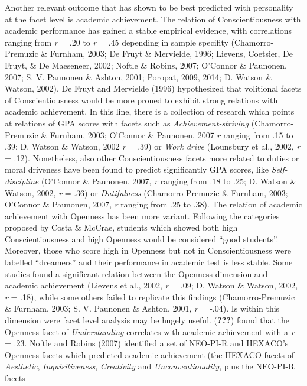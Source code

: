 \documentclass[,man,floatsintext]{apa6}
\begin{document}
Another relevant outcome that has shown to be best predicted with
personality at the facet level is academic achievement. The relation of
Conscientiousness with academic performance has gained a stable
empirical evidence, with correlations ranging from \emph{r} = .20 to
\emph{r} = .45 depending in sample specifity (Chamorro-Premuzic \&
Furnham, 2003; De Fruyt \& Mervielde, 1996; Lievens, Coetsier, De Fruyt,
\& De Maeseneer, 2002; Noftle \& Robins, 2007; O'Connor \& Paunonen,
2007; S. V. Paunonen \& Ashton, 2001; Poropat, 2009, 2014; D. Watson \&
Watson, 2002). De Fruyt and Mervielde (1996) hypothesized that
volitional facets of Conscientiousness would be more proned to exhibit
strong relations with academic achievement. In this line, there is a
collection of research which points at relations of GPA scores with
facets such as \emph{Achievement-striving} (Chamorro-Premuzic \&
Furnham, 2003; O'Connor \& Paunonen, 2007 \emph{r} ranging from .15 to
.39; D. Watson \& Watson, 2002 \emph{r} = .39) or \emph{Work drive}
(Lounsbury et al., 2002, \emph{r} = .12). Nonetheless, also other
Conscientiousness facets more related to duties or moral driveness have
been found to predict significantly GPA scores, like
\emph{Self-discipline} (O'Connor \& Paunonen, 2007, \emph{r} ranging
from .18 to .25; D. Watson \& Watson, 2002, \emph{r} = .36) or
\emph{Dutifulness} (Chamorro-Premuzic \& Furnham, 2003; O'Connor \&
Paunonen, 2007, \emph{r} ranging from .25 to .38). The relation of
academic achievement with Openness has been more variant. Following the
categories proposed by Costa \& McCrae, students which showed both high
Conscientiousness and high Openness would be considered \enquote{good
students}. Moreover, those who score high in Openness but not in
Conscientiousness were labelled \enquote{dreamers} and their performance
in academic test is less stable. Some studies found a significant
relation between the Openness dimension and academic achievement
(Lievens et al., 2002, \emph{r} = .09; D. Watson \& Watson, 2002,
\emph{r} = .18), while some others failed to replicate this findings
(Chamorro-Premuzic \& Furnham, 2003; S. V. Paunonen \& Ashton, 2001,
\emph{r} = -.04). Is within this dimension were facet level analysis may
be hugely useful. ({\textbf{???}}) found that the Openness facet of
\emph{Understanding} correlates with academic achievement with a
\emph{r} = .23. Noftle and Robins (2007) identified a set of NEO-PI-R
and HEXACO's Openness facets which predicted academic achievement (the
HEXACO facets of \emph{Aesthetic}, \emph{Inquisitiveness},
\emph{Creativity} and \emph{Unconventionality}, plus the NEO-PI-R facets
\end{document}
